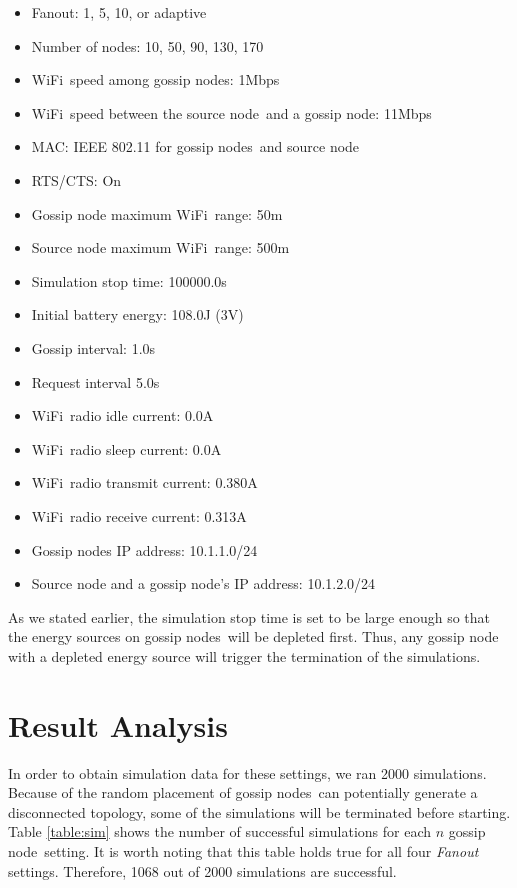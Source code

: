 \documentclass[onehalf,11pt]{beavtex}
\newcommand{\gn}{gossip node}
\newcommand{\gns}{gossip nodes}
\newcommand{\wf}{WiFi}
\newcommand{\sn}{source node}
\begin{document}
\begin{itemize}
	\item Fanout: 1, 5, 10, or adaptive
	\item Number of nodes: 10, 50, 90, 130, 170
	\item \wf ~speed among \gns: 1Mbps
	\item \wf ~speed between the \sn ~and a \gn: 11Mbps
	\item MAC: IEEE 802.11 for \gns ~and \sn
	\item RTS/CTS: On
	\item Gossip node maximum \wf ~range: 50m
	\item Source node maximum \wf ~range: 500m
	\item Simulation stop time: 100000.0s
	\item Initial battery energy: 108.0J  (3V)
	\item Gossip interval: 1.0s
	\item Request interval 5.0s
	\item \wf ~radio idle current: 0.0A
	\item \wf ~radio sleep current: 0.0A
	\item \wf ~radio transmit current: 0.380A
	\item \wf ~radio receive current: 0.313A
	\item Gossip nodes IP address: 10.1.1.0/24
	\item Source node and a \gn's IP address: 10.1.2.0/24	
\end{itemize}

As we stated earlier, the simulation stop time is set to be large enough so that the energy sources on \gns ~will be depleted first. Thus, any gossip node with a depleted energy source will trigger the termination of the simulations. 

\section{Result Analysis}

In order to obtain simulation data for these settings, we ran 2000 simulations. Because of the random placement of \gns ~can potentially generate a disconnected topology, some of the simulations will be terminated before starting. Table \ref{table:sim} shows the number of successful simulations for each $n$ \gn ~setting. It is worth noting that this table holds true for all four \emph{Fanout} settings. Therefore, 1068 out of 2000 simulations are successful.
\end{document}
